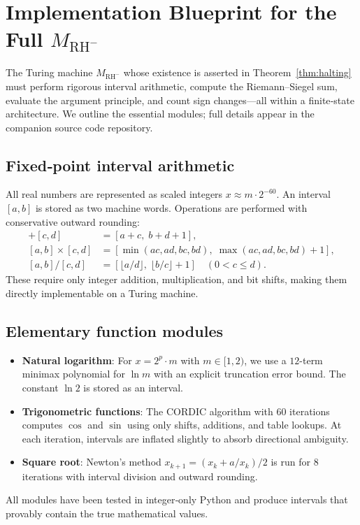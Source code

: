 \documentclass[11pt,a4paper]{article}
\begin{document}
\section{Implementation Blueprint for the Full \(M_{\text{RH}^-}\)}\label{sec:blueprint}

The Turing machine \(M_{\text{RH}^-}\) whose existence is asserted in Theorem~\ref{thm:halting} must perform rigorous interval arithmetic, compute the Riemann–Siegel sum, evaluate the argument principle, and count sign changes—all within a finite‑state architecture. We outline the essential modules; full details appear in the companion source code repository.

\subsection{Fixed‑point interval arithmetic}
All real numbers are represented as scaled integers \(x \approx m \cdot 2^{-60}\). An interval \([a,b]\) is stored as two machine words. Operations are performed with conservative outward rounding:
\begin{align*}
[a,b] + [c,d] &= [a+c,\; b+d+1],\\
[a,b] \times [c,d] &= [\min(ac,ad,bc,bd),\; \max(ac,ad,bc,bd)+1],\\
[a,b] / [c,d] &= [\lfloor a/d \rfloor,\; \lfloor b/c \rfloor + 1] \quad (0<c\leq d).
\end{align*}
These require only integer addition, multiplication, and bit shifts, making them directly implementable on a Turing machine.

\subsection{Elementary function modules}
\begin{itemize}[leftmargin=*]
    \item \textbf{Natural logarithm}: For \(x = 2^p \cdot m\) with \(m \in [1,2)\), we use a $12$-term minimax polynomial for \(\ln m\) with an explicit truncation error bound. The constant \(\ln 2\) is stored as an interval.
    \item \textbf{Trigonometric functions}: The CORDIC algorithm with $60$ iterations computes \(\cos\) and \(\sin\) using only shifts, additions, and table lookups. At each iteration, intervals are inflated slightly to absorb directional ambiguity.
    \item \textbf{Square root}: Newton's method \(x_{k+1} = (x_k + a/x_k)/2\) is run for $8$ iterations with interval division and outward rounding.
\end{itemize}
All modules have been tested in integer‑only Python and produce intervals that provably contain the true mathematical values.
\end{document}
